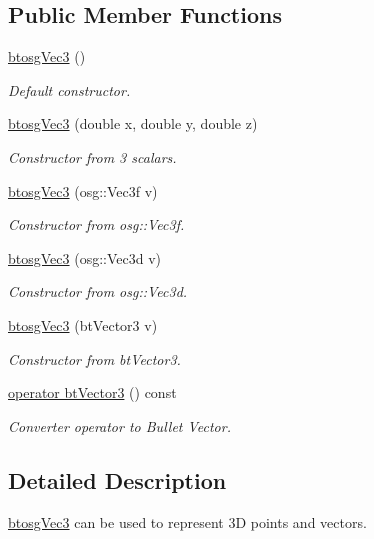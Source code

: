 \subsection*{Public Member Functions}
\begin{DoxyCompactItemize}
\item 
\hyperlink{classbtosgVec3_a3acd9fe06eeea6dfdec4f7dd6a22abc2}{btosg\+Vec3} ()
\begin{DoxyCompactList}\small\item\em Default constructor. \end{DoxyCompactList}\item 
\hyperlink{classbtosgVec3_a8bebd055644195494a10937ca754f55b}{btosg\+Vec3} (double x, double y, double z)
\begin{DoxyCompactList}\small\item\em Constructor from 3 scalars. \end{DoxyCompactList}\item 
\hyperlink{classbtosgVec3_a029392a1bc72f7031b8ca99aa814e2a1}{btosg\+Vec3} (osg\+::\+Vec3f v)
\begin{DoxyCompactList}\small\item\em Constructor from osg\+::\+Vec3f. \end{DoxyCompactList}\item 
\hyperlink{classbtosgVec3_a34c56d6b0bb27fffa5f4089d7a81b320}{btosg\+Vec3} (osg\+::\+Vec3d v)
\begin{DoxyCompactList}\small\item\em Constructor from osg\+::\+Vec3d. \end{DoxyCompactList}\item 
\hyperlink{classbtosgVec3_a2c7014fd9cd67b1918fdf2f53e0d1372}{btosg\+Vec3} (bt\+Vector3 v)
\begin{DoxyCompactList}\small\item\em Constructor from bt\+Vector3. \end{DoxyCompactList}\item 
\hyperlink{classbtosgVec3_a8e9e5bea1a46ba76e213a3f6e5e14dba}{operator bt\+Vector3} () const
\begin{DoxyCompactList}\small\item\em Converter operator to Bullet Vector. \end{DoxyCompactList}\end{DoxyCompactItemize}


\subsection{Detailed Description}
\hyperlink{classbtosgVec3}{btosg\+Vec3} can be used to represent 3D points and vectors. 

